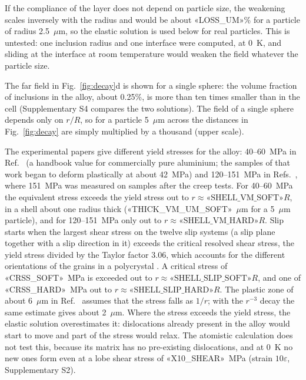 \documentclass[11pt,a4paper]{article}
\begin{document}
If the compliance of the layer does not depend on particle size, the
weakening scales inversely with the radius and would be about «LOSS_UM»\% for
a particle of radius 2.5~$\mu$m, so the elastic solution is used below for
real particles. This is untested: one inclusion radius and one interface were
computed, at 0~K, and sliding at the interface at room temperature would
weaken the field whatever the particle size.

The far field in Fig.~\ref{fig:decay}d is shown for a single sphere: the
volume fraction of inclusions in the alloy, about 0.25\%, is more than ten
times smaller than in the cell (Supplementary S4 compares the two
solutions). The field of a single sphere depends only on $r/R$, so for a
particle 5~$\mu$m across the distances in Fig.~\ref{fig:decay} are simply
multiplied by a thousand (upper scale).

The experimental papers give different yield stresses for the alloy:
40--60~MPa in Ref.~\cite{Friha2024JMMM} (a handbook value for commercially
pure aluminium; the samples of that work began to deform plastically at
about 42~MPa) and 120--151~MPa in Refs.~\cite{Skvortsov2019JAP,Pshonkin2025ZL},
where 151~MPa was measured on samples after the creep tests. For
40--60~MPa the equivalent stress exceeds the yield stress out to
$r\approx\text{«SHELL_VM_SOFT»}R$, in a shell about one radius thick
(«THICK_VM_UM_SOFT»~$\mu$m for a 5~$\mu$m particle), and for
120--151~MPa only out to $r\approx\text{«SHELL_VM_HARD»}R$. Slip starts
when the largest shear stress on the twelve slip systems (a slip plane
together with a slip direction in it) exceeds the critical resolved shear
stress, the yield stress divided by the Taylor factor 3.06, which accounts
for the different orientations of the grains in a polycrystal
\cite{StollerZinkle2000}. A critical stress of «CRSS_SOFT»~MPa is exceeded
out to $r\approx\text{«SHELL_SLIP_SOFT»}R$, and one of «CRSS_HARD»~MPa out
to $r\approx\text{«SHELL_SLIP_HARD»}R$. The plastic zone of about
6~$\mu$m in Ref.~\cite{Skvortsov2019JAP} assumes that the stress falls as
$1/r$; with the $r^{-3}$ decay the same estimate gives about 2~$\mu$m.
Where the stress exceeds the yield stress, the elastic solution
overestimates it: dislocations already present in the alloy would start to
move and part of the stress would relax. The atomistic calculation does not
test this, because its matrix has no pre-existing dislocations, and at 0~K
no new ones form even at a lobe shear stress of «X10_SHEAR»~MPa (strain
$10\varepsilon$, Supplementary S2).
\end{document}
